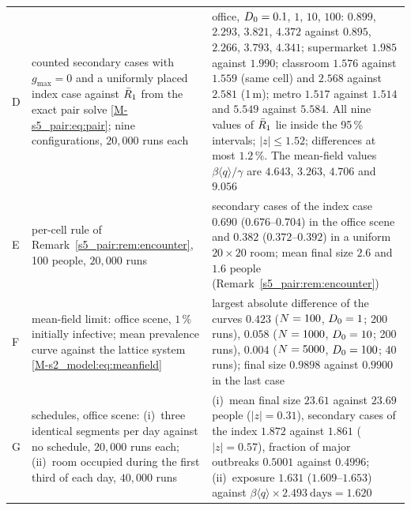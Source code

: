 \begin{table}[tbp]
\begin{tabular}{@{}p{0.3cm}p{6.5cm}p{8.3cm}@{}}
\addlinespace[3pt]
D & counted secondary cases with $g_{\max}=0$ and a uniformly placed index case against $\bar{R}_1$ from the
    exact pair solve \eqref{M-s5_pair:eq:pair}; nine configurations, $20{,}000$ runs each &
    office, $D_0=0.1$, $1$, $10$, $100$: $0.899$, $2.293$, $3.821$, $4.372$ against $0.895$, $2.266$, $3.793$,
    $4.341$; supermarket $1.985$ against $1.990$; classroom $1.576$ against $1.559$ (same cell) and $2.568$
    against $2.581$ (1\,m); metro $1.517$ against $1.514$ and $5.549$ against $5.584$. All nine values of
    $\bar{R}_1$ lie inside the 95\,\% intervals; $|z|\le1.52$; differences at most $1.2\,\%$. The mean-field
    values $\beta\langle q\rangle/\gamma$ are $4.643$, $3.263$, $4.706$ and $9.056$\\
\addlinespace[3pt]
E & per-cell rule of Remark~\ref{s5_pair:rem:encounter}, 100 people, $20{,}000$ runs &
    secondary cases of the index case $0.690$ ($0.676$--$0.704$) in the office scene and $0.382$
    ($0.372$--$0.392$) in a uniform $20\times20$ room; mean final size $2.6$ and $1.6$ people
    (Remark~\ref{s5_pair:rem:encounter})\\
\addlinespace[3pt]
F & mean-field limit: office scene, $1\,\%$ initially infective; mean prevalence curve against the lattice
    system \eqref{M-s2_model:eq:meanfield} &
    largest absolute difference of the curves $0.423$ ($N=100$, $D_0=1$; 200 runs), $0.058$
    ($N=1000$, $D_0=10$; 200 runs), $0.004$ ($N=5000$, $D_0=100$; 40 runs); final size $0.9898$
    against $0.9900$ in the last case\\
\addlinespace[3pt]
G & schedules, office scene: (i)~three identical segments per day against no schedule, $20{,}000$ runs each;
    (ii)~room occupied during the first third of each day, $40{,}000$ runs &
    (i)~mean final size $23.61$ against $23.69$ people ($|z|=0.31$), secondary cases of the index $1.872$
    against $1.861$ ($|z|=0.57$), fraction of major outbreaks $0.5001$ against $0.4996$; (ii)~exposure $1.631$
    ($1.609$--$1.653$) against $\beta\langle q\rangle\times2.493\ \mathrm{days}=1.620$\\
\bottomrule
\end{tabular}
\end{table}

